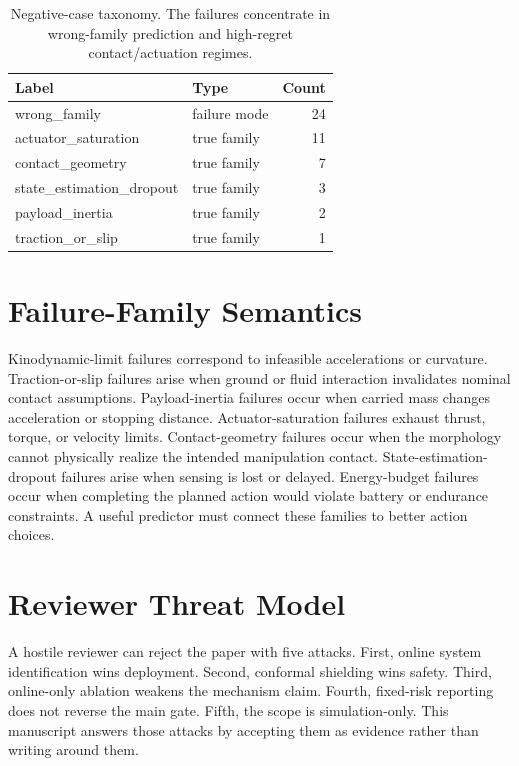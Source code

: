 \documentclass{article}
\begin{document}
\begin{table}[t]
\centering
\small
\begin{tabular}{llr}
\toprule
Label & Type & Count \\
\midrule
wrong\_family & failure mode & 24 \\
actuator\_saturation & true family & 11 \\
contact\_geometry & true family & 7 \\
state\_estimation\_dropout & true family & 3 \\
payload\_inertia & true family & 2 \\
traction\_or\_slip & true family & 1 \\
\bottomrule
\end{tabular}
\caption{Negative-case taxonomy. The failures concentrate in wrong-family prediction and high-regret contact/actuation regimes.}
\label{tab:negativetaxonomy}
\end{table}


\section{Failure-Family Semantics}
Kinodynamic-limit failures correspond to infeasible accelerations or curvature. Traction-or-slip failures arise when ground or fluid interaction invalidates nominal contact assumptions. Payload-inertia failures occur when carried mass changes acceleration or stopping distance. Actuator-saturation failures exhaust thrust, torque, or velocity limits. Contact-geometry failures occur when the morphology cannot physically realize the intended manipulation contact. State-estimation-dropout failures arise when sensing is lost or delayed. Energy-budget failures occur when completing the planned action would violate battery or endurance constraints. A useful predictor must connect these families to better action choices.

\section{Reviewer Threat Model}
A hostile reviewer can reject the paper with five attacks. First, online system identification wins deployment. Second, conformal shielding wins safety. Third, online-only ablation weakens the mechanism claim. Fourth, fixed-risk reporting does not reverse the main gate. Fifth, the scope is simulation-only. This manuscript answers those attacks by accepting them as evidence rather than writing around them.
\end{document}
